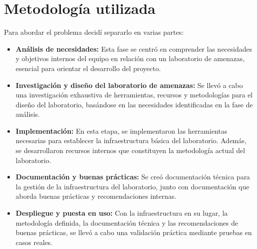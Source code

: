\documentclass[12pt]{caltech_thesis}
\begin{document}



\chapter{Metodología utilizada}

Para abordar el problema decidí separarlo en varias partes:

\begin{itemize}
    \item \textbf{Análisis de necesidades:} Esta fase se centró en comprender las necesidades y objetivos internos del equipo en relación con un laboratorio de amenazas, esencial para orientar el desarrollo del proyecto.
    
    \item \textbf{Investigación y diseño del laboratorio de amenazas:} Se llevó a cabo una investigación exhaustiva de herramientas, recursos y metodologías para el diseño del laboratorio, basándose en las necesidades identificadas en la fase de análisis.
    
    \item \textbf{Implementación:} En esta etapa, se implementaron las herramientas necesarias para establecer la infraestructura básica del laboratorio. Además, se desarrollaron recursos internos que constituyen la metodología actual del laboratorio.
    
    \item \textbf{Documentación y buenas prácticas:} Se creó documentación técnica para la gestión de la infraestructura del laboratorio, junto con documentación que aborda buenas prácticas y recomendaciones internas.
    
    \item \textbf{Despliegue y puesta en uso:} Con la infraestructura en su lugar, la metodología definida, la documentación técnica y las recomendaciones de buenas prácticas, se llevó a cabo una validación práctica mediante pruebas en casos reales.
\end{itemize}
\end{document}
